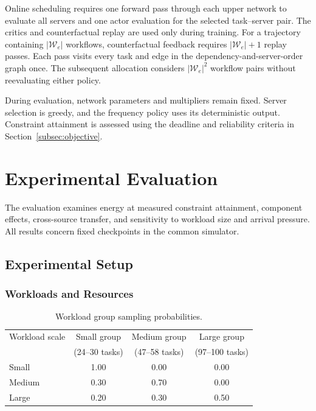 \documentclass[journal]{IEEEtran}
\begin{document}
Online scheduling requires one forward pass through each upper network to evaluate all servers and one actor evaluation for the selected task--server pair. The critics and counterfactual replay are used only during training. For a trajectory containing $|\mathcal W_e|$ workflows, counterfactual feedback requires $|\mathcal W_e|+1$ replay passes. Each pass visits every task and edge in the dependency-and-server-order graph once. The subsequent allocation considers $|\mathcal W_e|^2$ workflow pairs without reevaluating either policy.

During evaluation, network parameters and multipliers remain fixed. Server selection is greedy, and the frequency policy uses its deterministic output. Constraint attainment is assessed using the deadline and reliability criteria in Section~\ref{subsec:objective}.

\section{Experimental Evaluation}
\label{sec:experiments}
The evaluation examines energy at measured constraint attainment, component effects, cross-source transfer, and sensitivity to workload size and arrival pressure. All results concern fixed checkpoints in the common simulator.

\subsection{Experimental Setup}
\label{subsec:experimental_setup}

\subsubsection{Workloads and Resources}

\begin{table}[t]
\centering
\caption{Workload group sampling probabilities.}
\label{tab:workflow_composition}
\footnotesize
\setlength{\tabcolsep}{5pt}
\renewcommand{\arraystretch}{1.08}
\begin{tabular}{@{}lccc@{}}
\toprule
Workload scale
& Small group
& Medium group
& Large group \\
& (24--30 tasks)
& (47--58 tasks)
& (97--100 tasks) \\
\midrule
Small  & 1.00 & 0.00 & 0.00 \\
Medium & 0.30 & 0.70 & 0.00 \\
Large  & 0.20 & 0.30 & 0.50 \\
\bottomrule
\end{tabular}
\end{table}
\end{document}
